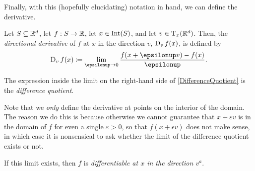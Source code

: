 Finally, with this (hopefully elucidating) notation in hand, we can define the derivative.
\begin{dfn}\label{DirectionalDerivative}
Let $S\subseteq \R ^d$, let $f:S\rightarrow \R$, let $x\in \Int (S)$, and let $v\in \tangent{\R ^d}{x}$.  Then, the \emph{directional derivative} of $f$ at $x$ in the direction $v$, $\D _vf(x)$, is defined by
\begin{equation}\label{DifferenceQuotient}
\D _vf(x)\coloneqq \lim _{\epsilon \to 0}\frac{f(x+\epsilon v)-f(x)}{\epsilon}.
\end{equation}
\begin{rmk}
The expression inside the limit on the right-hand side of \eqref{DifferenceQuotient} is the \emph{difference quotient}.
\end{rmk}
\begin{rmk}
Note that we \emph{only} define the derivative at points on the interior of the domain.  The reason we do this is because otherwise we cannot guarantee that $x+\varepsilon v$ is in the domain of $f$ for even a single $\varepsilon >0$, so that $f(x+\epsilon v)$ does not make sense, in which case it is nonsensical to ask whether the limit of the difference quotient exists or not.
\end{rmk}
\end{dfn}
If this limit exists, then $f$ is \emph{differentiable at $x$ in the direction $v^a$}.
